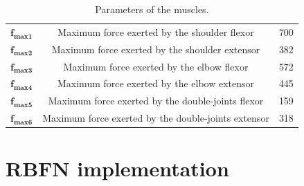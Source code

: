 \documentclass[pdftex,a4paper,11pt]{report}
\begin{document}
\begin{table}[hbt]
\caption{Parameters of the muscles.}
\begin{center}
\begin{tabular}{|c|c|c|}
\hline  
$\textbf{f}_{\textbf{max1}}$ & Maximum force exerted by the shoulder flexor & 700\\
$\textbf{f}_{\textbf{max2}}$ & Maximum force exerted by the shoulder extensor & 382\\
$\textbf{f}_{\textbf{max3}}$ & Maximum force exerted by the elbow flexor & 572\\
$\textbf{f}_{\textbf{max4}}$ & Maximum force exerted by the elbow extensor & 445\\
$\textbf{f}_{\textbf{max5}}$ & Maximum force exerted by the double-joints flexor & 159\\
$\textbf{f}_{\textbf{max6}}$ & Maximum force exerted by the double-joints extensor & 318\\
\hline
\end{tabular}
\end{center}
\label{MuscleParamTable}
\end{table}

\pagebreak

\section{RBFN implementation}
\label{sec_rbfnCode}




\end{document}
